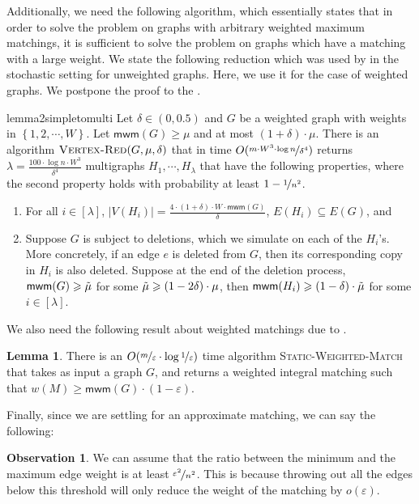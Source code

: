 \documentclass[a4paper,11pt]{article}
\newcommand{\card}[1]{|#1|}
\newcommand{\set}[1]{\ensuremath{\left\{ #1 \right\}}}
\newcommand{\eps}{\varepsilon}
\theoremstyle{definition}
\theoremstyle{definition}
\theoremstyle{definition}
\theoremstyle{definition}
\theoremstyle{definition}
\newtheorem{lemma2}[definition2]{Lemma}
\theoremstyle{definition}
\theoremstyle{definition}
\newtheorem{observation2}[definition2]{Observation}
\theoremstyle{definition}
\theoremstyle{definition}
\theoremstyle{definition}
\theoremstyle{definition}
\theoremstyle{definition}
\theoremstyle{definition}
\theoremstyle{definition}
\theoremstyle{definition}
\begin{document}
Additionally, we need the following algorithm, which essentially states that in order to solve the problem on graphs with arbitrary weighted maximum matchings, it is sufficient to solve the problem on graphs which have a matching with a large weight. We state the following reduction which was used by \cite{AKL19} in the stochastic setting for unweighted graphs. Here, we use it for the case of weighted graphs. We postpone the proof to the .

\begin{restatable}{lemma2}{simpletomulti}\label{lem:simpletomulti}
Let $\delta\in (0,0.5)$ and $G$ be a weighted graph with weights in $\set{1,2,\cdots, W}$. Let $\textsf{mwm}(G)\geqslant \mu$ and at most $(1+\delta)\cdot \mu$.  There is an algorithm $\textsc{Vertex-Red}(G,\mu, \delta)$ that in time $O(\nicefrac{m\cdot W^3\cdot \log n}{\delta^4})$ returns $\lambda = \frac{100\cdot \log n\cdot W^3}{\delta^4}$ multigraphs $H_1,\cdots, H_{\lambda}$ that have the following properties, where the second property holds with probability at least $1-\nicefrac{1}{n^{2}}$. 
\begin{enumerate}
\item For all $i\in [\lambda]$, $\card{V(H_i)}=\frac{4\cdot (1+\delta)\cdot W\cdot \textsf{mwm}(G)}{\delta}$, $E(H_i)\subseteq E(G)$, and \label{item:parta}
\item Suppose $G$ is subject to deletions, which we simulate on each of the $H_i$'s. More concretely, if an edge $e$ is deleted from $G$, then its corresponding copy in $H_i$ is also deleted. Suppose at the end of the deletion process, $\textsf{mwm}(G)\geqslant \Tilde{\mu}$ for some $\Tilde{\mu}\geqslant (1-2\delta)\cdot \mu$, then $\textsf{mwm}(H_i)\geqslant (1-\delta)\cdot \Tilde{\mu}$ for some $i\in [\lambda]$. \label{item:partb}
\end{enumerate}
\end{restatable}
We also need the following result about weighted matchings due to \cite{DP14}.
\begin{lemma2}\label{lem:staticmatch}
There is an $O(\nicefrac{m}{\eps}\cdot \log \nicefrac{1}{\eps})$ time algorithm \textsc{Static-Weighted-Match} that takes as input a graph $G$, and returns a weighted integral matching such that $w(M)\geqslant \textsf{mwm}(G)\cdot (1-\eps)$. 
\end{lemma2}

Finally, since we are settling for an approximate matching, we can say the following:

\begin{observation2}\label{obs:ratiominmaxweight}
We can assume that the ratio between the minimum and the maximum edge weight is at least $\nicefrac{\eps^2}{n^2}$. This is because throwing out all the edges below this threshold will only reduce the weight of the matching by $o(\eps)$. 
\end{observation2}
\end{document}
